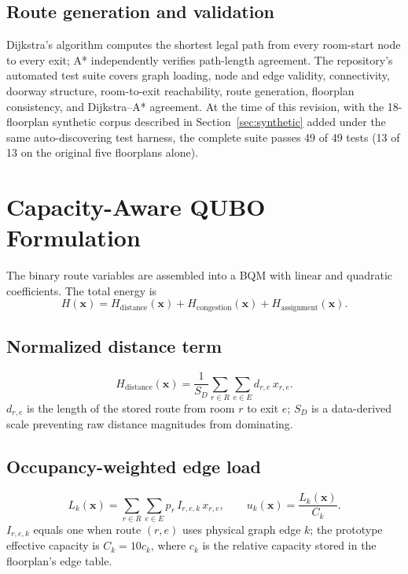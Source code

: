 \documentclass[11pt]{article}
\begin{document}
\subsection{Route generation and validation}
Dijkstra's algorithm computes the shortest legal path from every room-start node to every exit; A* independently verifies path-length agreement. The repository's automated test suite covers graph loading, node and edge validity, connectivity, doorway structure, room-to-exit reachability, route generation, floorplan consistency, and Dijkstra--A* agreement. At the time of this revision, with the 18-floorplan synthetic corpus described in Section~\ref{sec:synthetic} added under the same auto-discovering test harness, the complete suite passes 49 of 49 tests (13 of 13 on the original five floorplans alone).

\section{Capacity-Aware QUBO Formulation}

The binary route variables are assembled into a BQM with linear and quadratic coefficients. The total energy is
\begin{equation}
H(\mathbf{x}) = H_{\text{distance}}(\mathbf{x}) + H_{\text{congestion}}(\mathbf{x}) + H_{\text{assignment}}(\mathbf{x}). \tag{2}
\end{equation}

\subsection{Normalized distance term}
\begin{equation}
H_{\text{distance}}(\mathbf{x}) = \frac{1}{S_D}\sum_{r \in R}\sum_{e \in E} d_{r,e}\, x_{r,e}. \tag{3}
\end{equation}
$d_{r,e}$ is the length of the stored route from room $r$ to exit $e$; $S_D$ is a data-derived scale preventing raw distance magnitudes from dominating.

\subsection{Occupancy-weighted edge load}
\begin{equation}
L_k(\mathbf{x}) = \sum_{r \in R}\sum_{e \in E} p_r\, I_{r,e,k}\, x_{r,e}, \qquad u_k(\mathbf{x}) = \frac{L_k(\mathbf{x})}{C_k}. \tag{4}
\end{equation}
$I_{r,e,k}$ equals one when route $(r,e)$ uses physical graph edge $k$; the prototype effective capacity is $C_k = 10 c_k$, where $c_k$ is the relative capacity stored in the floorplan's edge table.
\end{document}
